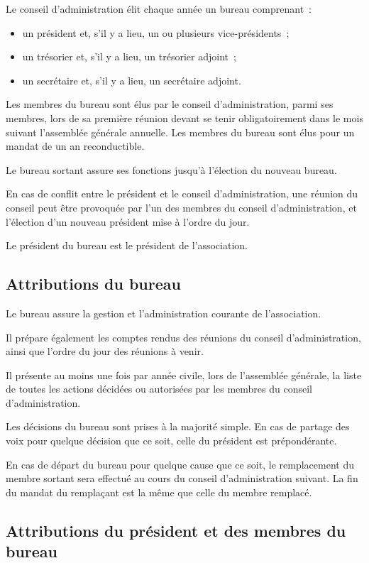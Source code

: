 \documentclass[a4wide,12pt]{scrartcl}
\begin{document}
Le conseil d'administration élit chaque année un bureau comprenant~:
\begin{itemize}
\item un président et, s'il y a lieu, un ou plusieurs
  vice-présidents~;
\item un trésorier et, s'il y a lieu, un trésorier adjoint~; 
\item un secrétaire et, s'il y a lieu, un secrétaire adjoint.
\end{itemize}

Les membres du bureau sont élus par le conseil d'administration, parmi
ses membres, lors de sa première réunion devant se tenir
obligatoirement dans le mois suivant l'assemblée générale
annuelle. Les membres du bureau sont élus pour un mandat de un an
reconductible.

Le bureau sortant assure ses fonctions jusqu'à l'élection du nouveau
bureau.

En cas de conflit entre le président et le conseil d'administration,
une réunion du conseil peut être provoquée par l'un des membres du
conseil d'administration, et l'élection d'un nouveau président mise à
l'ordre du jour.

Le président du bureau est le président de l'association.

\subsection{Attributions du bureau}

Le bureau assure la gestion et l'administration courante de
l'association.

Il prépare également les comptes rendus des réunions du conseil
d'administration, ainsi que l'ordre du jour des réunions à venir.

Il présente au moins une fois par année civile, lors de l'assemblée
générale, la liste de toutes les actions décidées ou autorisées par
les membres du conseil d'administration.

Les décisions du bureau sont prises à la majorité simple. En cas de
partage des voix pour quelque décision que ce soit, celle du président
est prépondérante.

En cas de départ du bureau pour quelque cause que ce soit, le
remplacement du membre sortant sera effectué au cours du conseil
d'administration suivant. La fin du mandat du remplaçant est la même
que celle du membre remplacé.
 
\subsection{Attributions du président et des membres du bureau}
\end{document}
